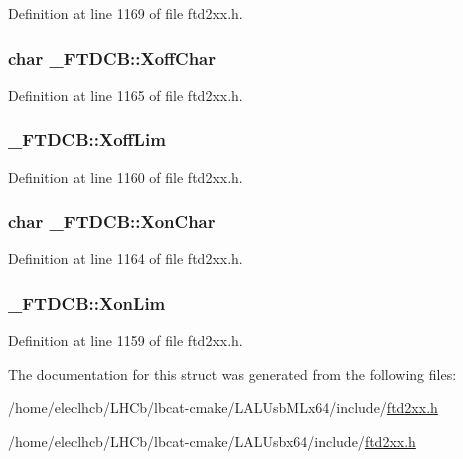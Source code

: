 Definition at line 1169 of file ftd2xx.h.\hypertarget{struct__FTDCB_a30a25a1c40525289b24b29f6593a6c51}{
\subsubsection[{XoffChar}]{\setlength{\rightskip}{0pt plus 5cm}char {\bf \_\-FTDCB::XoffChar}}}
\label{struct__FTDCB_a30a25a1c40525289b24b29f6593a6c51}


Definition at line 1165 of file ftd2xx.h.\hypertarget{struct__FTDCB_af78536d2734d9172b6707df1d3b1326d}{
\subsubsection[{XoffLim}]{ {\bf \_\-FTDCB::XoffLim}}}
\label{struct__FTDCB_af78536d2734d9172b6707df1d3b1326d}


Definition at line 1160 of file ftd2xx.h.\hypertarget{struct__FTDCB_aee3e405df31d5b168110814d5529b014}{
\subsubsection[{XonChar}]{\setlength{\rightskip}{0pt plus 5cm}char {\bf \_\-FTDCB::XonChar}}}
\label{struct__FTDCB_aee3e405df31d5b168110814d5529b014}


Definition at line 1164 of file ftd2xx.h.\hypertarget{struct__FTDCB_a44679a1dcfaa0f97bc4d1500538c4b47}{
\subsubsection[{XonLim}]{ {\bf \_\-FTDCB::XonLim}}}
\label{struct__FTDCB_a44679a1dcfaa0f97bc4d1500538c4b47}


Definition at line 1159 of file ftd2xx.h.

The documentation for this struct was generated from the following files:\begin{DoxyCompactItemize}
\item 
/home/eleclhcb/LHCb/lbcat-\/cmake/LALUsbMLx64/include/\hyperlink{LALUsbMLx64_2include_2ftd2xx_8h}{ftd2xx.h}\item 
/home/eleclhcb/LHCb/lbcat-\/cmake/LALUsbx64/include/\hyperlink{LALUsbx64_2include_2ftd2xx_8h}{ftd2xx.h}\end{DoxyCompactItemize}
